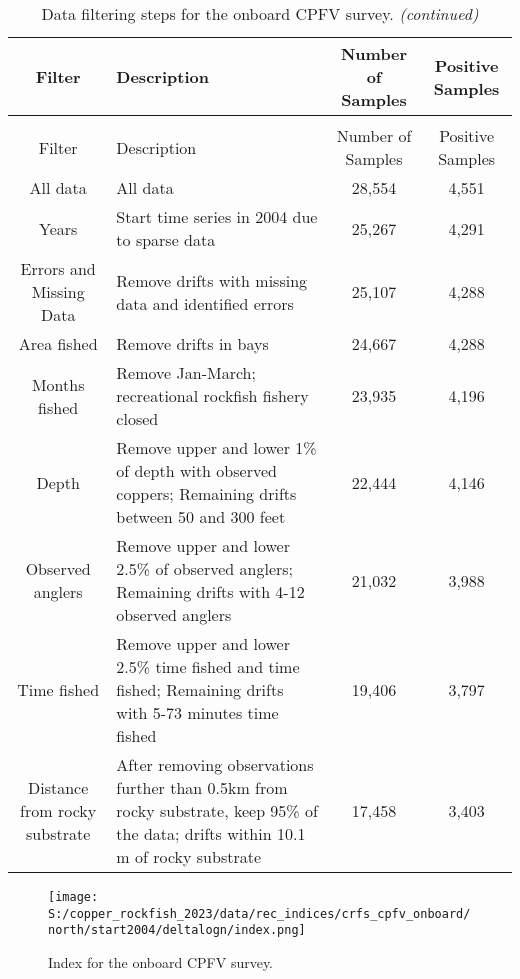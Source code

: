 \documentclass[11pt,
  english,
  letterpaper,
]{article}
\begin{document}
\begin{landscape}\begingroup\fontsize{10}{12}\selectfont

\begin{longtable}[t]{c>{\centering\arraybackslash}p{8cm}cc}
\caption{\label{tab:onboard-filter}Data filtering steps for the onboard CPFV survey.}\\
\toprule
Filter & Description & Number of Samples & Positive Samples\\
\midrule
\endfirsthead
\caption[]{\label{tab:onboard-filter}Data filtering steps for the onboard CPFV survey. \textit{(continued)}}\\
\toprule
Filter & Description & Number of Samples & Positive Samples\\
\midrule
\endhead

\endfoot
\bottomrule
\endlastfoot
All data & All data & 28,554 & 4,551\\
Years & Start time series in 2004 due to sparse data & 25,267 & 4,291\\
Errors and Missing Data & Remove drifts with missing data and identified errors & 25,107 & 4,288\\
Area fished & Remove drifts in bays & 24,667 & 4,288\\
Months fished & Remove Jan-March; recreational rockfish fishery closed & 23,935 & 4,196\\
Depth & Remove upper and lower 1\% of depth with observed coppers;
                                           Remaining drifts between 50 and 300 feet & 22,444 & 4,146\\
Observed anglers & Remove upper and lower 2.5\% of observed anglers;
                                           Remaining drifts with 4-12 observed anglers & 21,032 & 3,988\\
Time fished & Remove upper and lower 2.5\% time fished and
                                         time fished; Remaining drifts with 5-73 minutes time fished & 19,406 & 3,797\\
Distance from rocky substrate & After removing observations further
than 0.5km from rocky substrate, keep 95\% of the data; drifts within 10.1 m of rocky substrate & 17,458 & 3,403\\*
\end{longtable}
\endgroup{}
\end{landscape}
\endgroup{}

\newpage

\begin{figure}
\centering
\texttt{[image: S:/copper\_rockfish\_2023/data/rec\_indices/crfs\_cpfv\_onboard/north/start2004/deltalogn/index.png]}
\caption{Index for the onboard CPFV survey.\label{fig:onboard-index}}
\end{figure}
\end{document}
